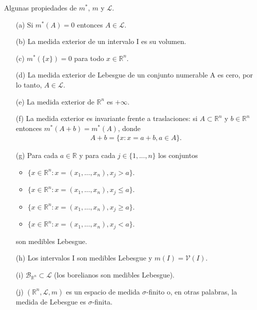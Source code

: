 \begin{prop}
    Algunas propiedades de $m^*$, $m$ y $\mathcal{L}$.
    \begin{enumerate}
        \item[(a)] Si $m^*(A) = 0$ entonces $A \in \mathcal{L}$.
        \item[(b)] La medida exterior de un intervalo I es  su volumen.
        \item[(c)] $m^*(\{x\}) = 0$ para todo $x \in \mathbb{R}^n$.
        \item[(d)] La medida exterior de Lebesgue de un conjunto numerable A es cero, por lo tanto, $A \in \mathcal{L}$.
        \item[(e)] La medida exterior de $\mathbb{R}^n$ es $+\infty$.
        \item[(f)] La medida exterior es invariante frente a traslaciones: si $A \subset \mathbb{R}^n$ y $b \in \mathbb{R}^n$ entonces $m^*(A + b) = m^*(A)$, donde
              \begin{align*}
                  A + b = \{ x : x = a + b, a \in A \}.
              \end{align*}
        \item[(g)] Para cada $a \in \mathbb{R}$ y para cada $j \in \{1,..., n \}$ los conjuntos
              \begin{itemize}
                  \item $\{x \in \mathbb{R}^n : x = (x_1,...,x_n), x_j > a\}$.
                  \item $\{x \in \mathbb{R}^n : x = (x_1,...,x_n), x_j \leq a\}$.
                  \item $\{x \in \mathbb{R}^n : x = (x_1,...,x_n), x_j \ge a\}$.
                  \item $\{x \in \mathbb{R}^n : x = (x_1,...,x_n), x_j < a\}$.
              \end{itemize}
              son medibles Lebesgue.
        \item[(h)] Los intervalos I son medibles Lebesgue y $m(I) = \mathcal{V}(I)$.
        \item[(i)] $\mathcal{B}_{\mathbb{R}^n} \subset \mathcal{L}$ (los borelianos son medibles Lebesgue).
        \item[(j)] $(\mathbb{R}^n, \mathcal{L}, m)$ es un espacio de medida $\sigma$-finito o, en otras palabras, la medida de Lebesgue es $\sigma$-finita.
    \end{enumerate}
\end{prop}


